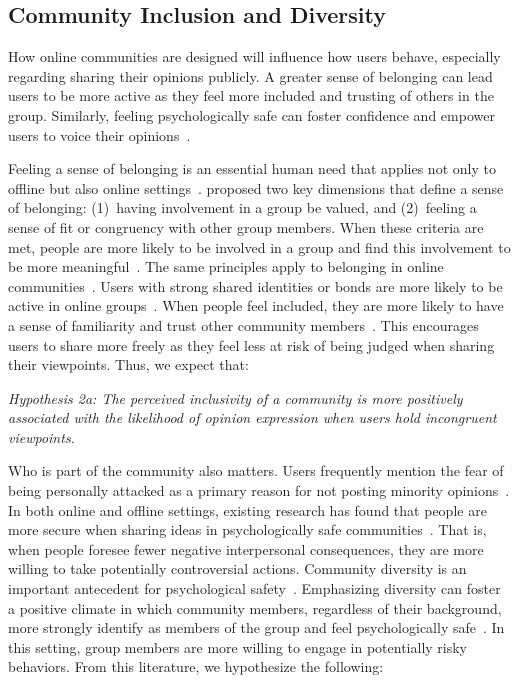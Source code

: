 \subsection{Community Inclusion and Diversity}
How online communities are designed will influence how users behave, especially regarding sharing their opinions publicly. A greater sense of belonging can lead users to be more active as they feel more included and trusting of others in the group. Similarly, feeling psychologically safe can foster confidence and empower users to voice their opinions~\cite{edmondson2014psychological}.

Feeling a sense of belonging is an essential human need that applies not only to offline but also online settings~\cite{maslow1958dynamic,lambert2013belong}. \citet{hagerty1992sense} proposed two key dimensions that define a sense of belonging: (1)~having involvement in a group be valued, and (2)~feeling a sense of fit or congruency with other group members. When these criteria are met, people are more likely to be involved in a group and find this involvement to be more meaningful~\cite{hagerty1996sense}. The same principles apply to belonging in online communities~\cite{lampe2010motivations}. Users with strong shared identities or bonds are more likely to be active in online groups~\cite{ren2007applying}. When people feel included, they are more likely to have a sense of familiarity and trust other community members~\cite{zhao2012cultivating}. This encourages users to share more freely as they feel less at risk of being judged when sharing their viewpoints. Thus, we expect that:

\vspace{0.25em}
\begin{addmargin}[1.25em]{0em}
\textit{Hypothesis 2a: The perceived inclusivity of a community is more positively associated with the likelihood of opinion expression when users hold incongruent viewpoints.}
\end{addmargin}
\vspace{0.25em}

Who is part of the community also matters. Users frequently mention the fear of being personally attacked as a primary reason for not posting minority opinions~\cite{neubaum2018we}. In both online and offline settings, existing research has found that people are more secure when sharing ideas in psychologically safe communities~\cite{newman2017psychological}. That is, when people foresee fewer negative interpersonal consequences, they are more willing to take potentially controversial actions. Community diversity is an important antecedent for psychological safety~\cite{newman2017psychological}. Emphasizing diversity can foster a positive climate in which community members, regardless of their background, more strongly identify as members of the group and feel psychologically safe~\cite{mckay2007racial}. In this setting, group members are more willing to engage in potentially risky behaviors. From this literature, we hypothesize the following:

